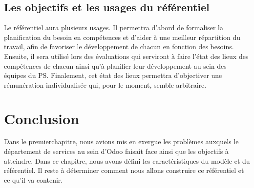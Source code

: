 \subsection{Les objectifs et les usages du référentiel}
Le référentiel aura plusieurs usages. Il permettra d'abord de formaliser la planification du besoin en compétences et d'aider à une meilleur répartition du travail, afin de favoriser le développement de chacun en fonction des besoins. Ensuite, il sera utilisé lors des évaluations qui serviront à faire l'état des lieux des compétences de chacun ainsi qu'à planifier leur développement au sein des équipes du PS. Finalement, cet état des lieux permettra d'objectiver une rémunération individualisée qui, pour le moment, semble arbitraire.



\section{Conclusion}
Dans le premierchapitre, nous avions mis en exergue les problèmes auxquels le département de services au sein d'Odoo faisait face ainsi que les objectifs à atteindre. Dans ce chapitre, nous avons défini les caractéristiques du modèle et du référentiel. Il reste à déterminer comment nous allons construire ce référentiel et ce qu'il va contenir.
 










 

